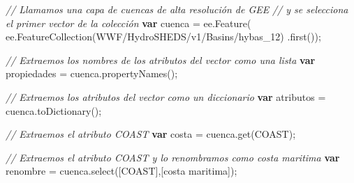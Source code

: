 \documentclass[
  12pt,
  letterpaper,
  twoside]{book}
\newenvironment{Shaded}{\begin{snugshade}}{\end{snugshade}}
\newcommand{\CommentTok}[1]{\textcolor[rgb]{0.24,0.58,0.00}{\textit{#1}}}
\newcommand{\FunctionTok}[1]{\textcolor[rgb]{0.48,0.12,0.64}{#1}}
\newcommand{\KeywordTok}[1]{\textcolor[rgb]{0.00,0.00,0.00}{\textbf{#1}}}
\newcommand{\NormalTok}[1]{#1}
\newcommand{\OperatorTok}[1]{\textcolor[rgb]{0.00,0.00,0.00}{#1}}
\newcommand{\StringTok}[1]{\textcolor[rgb]{0.87,0.29,0.22}{#1}}
\begin{document}
\begin{Shaded}
\begin{Highlighting}[]
\CommentTok{// Llamamos una capa de cuencas de alta resolución de GEE}
\CommentTok{// y se selecciona el primer vector de la colección}
\KeywordTok{var}\NormalTok{ cuenca }\OperatorTok{=}\NormalTok{ ee}\OperatorTok{.}\FunctionTok{Feature}\NormalTok{(}
\NormalTok{  ee}\OperatorTok{.}\FunctionTok{FeatureCollection}\NormalTok{(}\StringTok{\textquotesingle{}WWF/HydroSHEDS/v1/Basins/hybas\_12\textquotesingle{}}\NormalTok{)}
  \OperatorTok{.}\FunctionTok{first}\NormalTok{())}\OperatorTok{;}

\CommentTok{// Extraemos los nombres de los atributos del vector como una lista}
\KeywordTok{var}\NormalTok{ propiedades }\OperatorTok{=}\NormalTok{ cuenca}\OperatorTok{.}\FunctionTok{propertyNames}\NormalTok{()}\OperatorTok{;}

\CommentTok{// Extraemos los atributos del vector como un diccionario}
\KeywordTok{var}\NormalTok{ atributos }\OperatorTok{=}\NormalTok{ cuenca}\OperatorTok{.}\FunctionTok{toDictionary}\NormalTok{()}\OperatorTok{;}

\CommentTok{// Extraemos el atributo \textquotesingle{}COAST\textquotesingle{}}
\KeywordTok{var}\NormalTok{ costa }\OperatorTok{=}\NormalTok{ cuenca}\OperatorTok{.}\FunctionTok{get}\NormalTok{(}\StringTok{\textquotesingle{}COAST\textquotesingle{}}\NormalTok{)}\OperatorTok{;}

\CommentTok{// Extraemos el atributo \textquotesingle{}COAST\textquotesingle{} y lo renombramos como \textquotesingle{}costa maritima\textquotesingle{}}
\KeywordTok{var}\NormalTok{ renombre }\OperatorTok{=}\NormalTok{ cuenca}\OperatorTok{.}\FunctionTok{select}\NormalTok{([}\StringTok{\textquotesingle{}COAST\textquotesingle{}}\NormalTok{]}\OperatorTok{,}\NormalTok{[}\StringTok{\textquotesingle{}costa maritima\textquotesingle{}}\NormalTok{])}\OperatorTok{;}
\end{Highlighting}
\end{Shaded}
\end{document}
